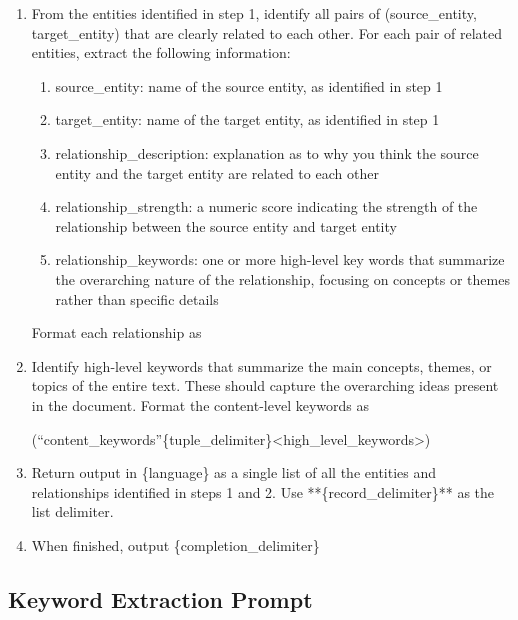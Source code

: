 \documentclass{article} %
\newcounter{promptcounter}
\newenvironment{promptbox}[2]{%
    \refstepcounter{promptcounter}%
    \label{#1}%
    \begin{tcolorbox}[
        colback=promptbg,
        colframe=promptborder,
        coltitle=white,
        colbacktitle=promptborder,
        title={\textbf{Prompt \thepromptcounter: #2}},
        fonttitle=\sffamily\bfseries,
        enhanced,
        breakable,
        attach boxed title to top left={yshift=-2mm, xshift=2mm},
        boxed title style={rounded corners},
        rounded corners,
        drop shadow,
        left=4pt,
        right=4pt,
        top=6pt,
        bottom=6pt
    ]%
}{%
    \end{tcolorbox}%
}
\begin{document}
\begin{promptbox}{prompt:entity_relationship}{Entity and Relationship Extraction}
\begin{enumerate}[itemsep=5pt]
    \item From the entities identified in step 1, identify all pairs of (source\_entity, target\_entity) that are clearly related to each other.
    For each pair of related entities, extract the following information:
    \begin{enumerate}
        \item[-] source\_entity: name of the source entity, as identified in step 1
        \item[-] target\_entity: name of the target entity, as identified in step 1
        \item[-] relationship\_description: explanation as to why you think the source entity and the target entity are related to each other
        \item[-] relationship\_strength: a numeric score indicating the strength of the relationship between the source entity and target entity
        \item[-] relationship\_keywords: one or more high-level key words that summarize the overarching nature of the relationship, focusing on concepts or themes rather than specific details
    \end{enumerate}
    Format each relationship as\\
    
    
    \item Identify high-level keywords that summarize the main concepts, themes, or topics of the entire text. These should capture the overarching ideas present in the document.
    Format the content-level keywords as
    
    (``content\_keywords''\{tuple\_delimiter\}<high\_level\_keywords>)
    \item Return output in \{language\} as a single list of all the entities and relationships identified in steps 1 and 2. Use **\{record\_delimiter\}** as the list delimiter.
    \item When finished, output \{completion\_delimiter\}
\end{enumerate}

\end{promptbox}


\subsection{Keyword Extraction Prompt}
\end{document}

